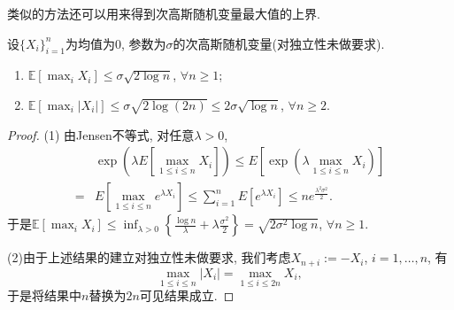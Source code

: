 类似的方法还可以用来得到次高斯随机变量最大值的上界. 
\begin{theorem}[次高斯随机变量最大值的上界]\label{thm:UpperBdForMaximaOfSGRV}
	设$\{X_i\}_{i=1}^n$为均值为$0$, 参数为$\sigma$的次高斯随机变量(对独立性未做要求). 
	\begin{enumerate}[label=(\arabic*)]
		\item $\mathbb{E} \left[ \max_i X_i \right] \leq \sigma \sqrt{2 \log n}$, $\forall n \geq 1$; 
		\item $\mathbb{E} \left[ \max_i \left| X_i \right| \right] \leq \sigma \sqrt{2 \log (2n)} \leq 2 \sigma \sqrt{\log n}$, $\forall n \geq 2$. 
	\end{enumerate}
\end{theorem}
\begin{proof}
(1) 由Jensen不等式, 对任意$\lambda > 0$, 
		\begin{align*}
			& \exp \left(\lambda E \left[ \max_{1 \leq i \leq n} X_i \right] \right)
			\leq E \left[ \exp \left( \lambda \max_{1 \leq i \leq n} X_i \right) \right] \\ 
			= & E \left[ \max_{1 \leq i \leq n} e^{\lambda X_i} \right]
			\leq \sum_{i=1}^n  E \left[ e^{\lambda X_i} \right]
			\leq n e^{\frac{\lambda^2 \sigma^2}{2}}. 
		\end{align*}
		于是$\mathbb{E} \left[ \max_i X_i \right] \leq \inf_{\lambda > 0} \left\{ \frac{\log n}{\lambda} + \lambda \frac{\sigma^2}{2} \right\} = \sqrt{2 \sigma^2 \log n}$, $\forall n \geq 1$. 

(2)由于上述结果的建立对独立性未做要求, 我们考虑$X_{n+i} := - X_i$, $i = 1, \dots, n$, 有
		\begin{equation*}
			\max_{1 \leq i \leq n} |X_i| = \max_{1 \leq i \leq 2n} X_i, 
		\end{equation*}
		于是将结果中$n$替换为$2n$可见结果成立. 
\end{proof}

